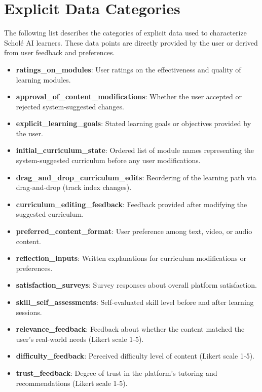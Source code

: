 \section{Explicit Data Categories}
\label{appendix:explicit_data}

The following list describes the categories of explicit data used to characterize Schol\'e AI learners. These data points are directly provided by the user or derived from user feedback and preferences.
{\footnotesize
\begin{itemize}
    \item \textbf{ratings\_on\_modules}: User ratings on the effectiveness and quality of learning modules.
    \item \textbf{approval\_of\_content\_modifications}: Whether the user accepted or rejected system-suggested changes.
    \item \textbf{explicit\_learning\_goals}: Stated learning goals or objectives provided by the user.
    \item \textbf{initial\_curriculum\_state}: Ordered list of module names representing the system-suggested curriculum before any user modifications.
    \item \textbf{drag\_and\_drop\_curriculum\_edits}: Reordering of the learning path via drag-and-drop (track index changes).
    \item \textbf{curriculum\_editing\_feedback}: Feedback provided after modifying the suggested curriculum.
    \item \textbf{preferred\_content\_format}: User preference among text, video, or audio content.
    \item \textbf{reflection\_inputs}: Written explanations for curriculum modifications or preferences.
    \item \textbf{satisfaction\_surveys}: Survey responses about overall platform satisfaction.
    \item \textbf{skill\_self\_assessments}: Self-evaluated skill level before and after learning sessions.
    \item \textbf{relevance\_feedback}: Feedback about whether the content matched the user's real-world needs (Likert scale 1-5).
    \item \textbf{difficulty\_feedback}: Perceived difficulty level of content (Likert scale 1-5).
    \item \textbf{trust\_feedback}: Degree of trust in the platform's tutoring and recommendations (Likert scale 1-5).
\end{itemize}
}

